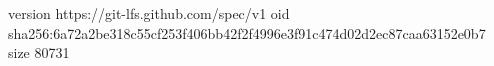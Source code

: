 version https://git-lfs.github.com/spec/v1
oid sha256:6a72a2be318c55cf253f406bb42f2f4996e3f91c474d02d2ec87caa63152e0b7
size 80731
